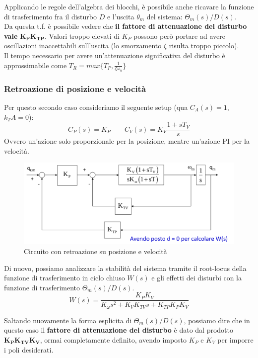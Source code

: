 Applicando le regole dell'algebra dei blocchi, è possibile anche ricavare la funzione di trasferimento fra il disturbo $D$ e l’uscita $\theta_m$ del sistema: $\Theta_m(s) / D(s)$.\\
Da questa t.f. è possibile vedere che \textbf{il fattore di attenuazione del disturbo vale} $\mathbf{K_PK_{TP}}$. Valori troppo elevati di $K_P$ possono però portare ad avere oscillazioni inaccettabili sull’uscita (lo smorzamento $\zeta$ risulta troppo piccolo).\\
Il tempo necessario per avere un’attenuazione significativa del disturbo è approssimabile come $T_R = max\{T_P, \frac{1}{\zeta \omega_n}\}$








\vspace{35pt}
\subsubsection{Retroazione di posizione e velocità}

Per questo secondo caso consideriamo il seguente setup (qua $C_A(s)=1$, $k_TA=0$):
$$
C_P(s) = K_P \qquad C_V(s)=K_V\frac{1+sT_V}{s}
$$
Ovvero un'azione solo proporzionale per la posizione, mentre un'azione PI per la velocità.

\begin{figure}[ht!]
	\centering
	\includegraphics[width=0.7\linewidth]{images/decentralized_joint_space_control_7}
	\caption{Circuito con retroazione su posizione e velocità}
	\label{fig:decentralizedjointspacecontrol7}
\end{figure}


Di nuovo, possiamo analizzare la stabilità del sistema tramite il root-locus della funzione di trasferimento in ciclo chiuso $W(s)$ e gli effetti dei disturbi con la funzione di trasferimento $\Theta_m(s)/D(s)$.
$$
W(s)=\frac{K_P K_V}{K_\omega s^2 + K_V K_{TV} s + K_{TP} K_P K_V}
$$

Saltando nuovamente la forma esplicita di $\Theta_m(s)/D(s)$, possiamo dire che in questo caso il \textbf{fattore di attenuazione del disturbo} è dato dal prodotto $\mathbf{K_P K_{TV} K_V}$, ormai completamente definito, avendo imposto $K_P$ e $K_V$ per imporre i poli desiderati.

